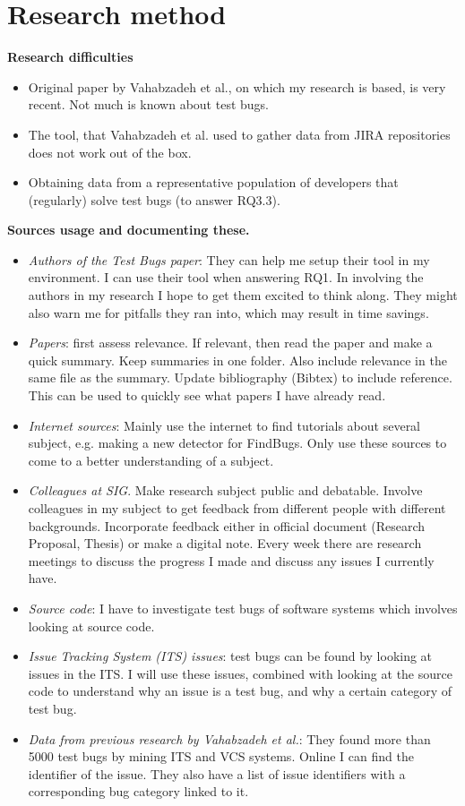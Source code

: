 \documentclass{uvamscse}
\newcommand{\Atestbugs}{Vahabzadeh et al.}
\begin{document}
\section{Research method}
\textbf{Research difficulties}
\begin{itemize}
	\item Original paper by \Atestbugs{}, on which my research is based, is very recent. Not much is known about test bugs.
	\item The tool, that \Atestbugs{} used to gather data from JIRA repositories does not work out of the box.
	\item Obtaining data from a representative population of developers that (regularly) solve test bugs (to answer RQ3.3). 
\end{itemize}
\textbf{Sources usage and documenting these.}
\begin{itemize}
	\item \textit{Authors of the Test Bugs paper}:  They can help me setup their tool in my environment. I can use their tool when answering RQ1. In involving the authors in my research I hope to get them excited to think along. They might also warn me for pitfalls they ran into, which may result in time savings.
	\item \textit{Papers}: first assess relevance. If relevant, then read the paper and make a quick summary. Keep summaries in one folder. Also include relevance in the same file as the summary. Update bibliography (Bibtex) to include reference. This can be used to quickly see what papers I have already read.
	\item \textit{Internet sources}: Mainly use the internet to find tutorials about several subject, e.g. making a new detector for FindBugs. Only use these sources to come to a better understanding of a subject.
	\item \textit{Colleagues at SIG}. Make research subject public and debatable. Involve colleagues in my subject to get feedback from different people with different backgrounds. Incorporate feedback either in official document (Research Proposal, Thesis) or make a digital note. Every week there are research meetings to discuss the progress I made and discuss any issues I currently have.
	\item \textit{Source code}: I have to investigate test bugs of software systems which involves looking at source code. 
	\item \textit{Issue Tracking System (ITS) issues}: test bugs can be found by looking at issues in the ITS. I will use these issues, combined with looking at the source code to understand why an issue is a test bug, and why a certain category of test bug.
	\item \textit{Data from previous research by \Atestbugs}: They found more than 5000 test bugs by mining ITS and VCS systems. Online I can find the identifier of the issue. They also have a list of issue identifiers with a corresponding bug category linked to it.	
\end{itemize}
\end{document}
